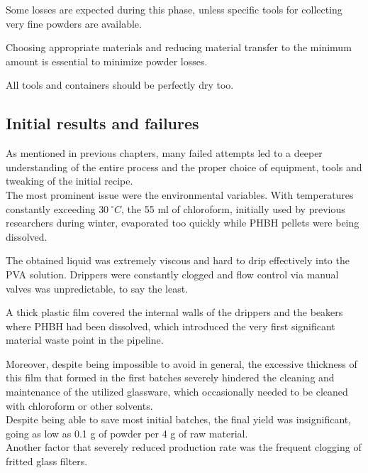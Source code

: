 \documentclass{article}
\begin{document}
        Some losses are expected during this phase, unless specific tools for collecting very fine powders are available. 

        Choosing appropriate materials and reducing material transfer to the minimum amount is essential to minimize 
        powder losses. 

        All tools and containers should be perfectly dry too. 



        \subsection{Initial results and failures\label{initial_failures}}

        As mentioned in previous chapters, many failed attempts led to a deeper understanding of the entire process 
        and the proper choice of equipment, tools and tweaking of the initial recipe. \\ 

        The most prominent issue were the environmental variables. With temperatures constantly exceeding 
        $30 \ ^{\circ}C$, the 55 ml of chloroform, initially used by previous researchers during winter, evaporated too 
        quickly while PHBH pellets were being dissolved. 

        The obtained liquid was extremely viscous and hard to drip effectively into the PVA solution. Drippers were constantly clogged
        and flow control via manual valves was unpredictable, to say the least. 
        
        A thick plastic film covered the internal walls of the drippers and the beakers where PHBH had been dissolved, which 
        introduced the very first significant material waste point in the pipeline. 

        Moreover, despite being impossible to avoid in general, the excessive thickness of this film that formed in the first batches 
        severely hindered the cleaning and maintenance of the utilized glassware, which occasionally needed to be cleaned with chloroform 
        or other solvents. \\ 

        Despite being able to save most initial batches, the final yield was insignificant, going as low as 0.1 g of powder 
        per 4 g of raw material. \\ 
        
        Another factor that severely reduced production rate was the frequent clogging of fritted glass filters. 
        
\end{document}
